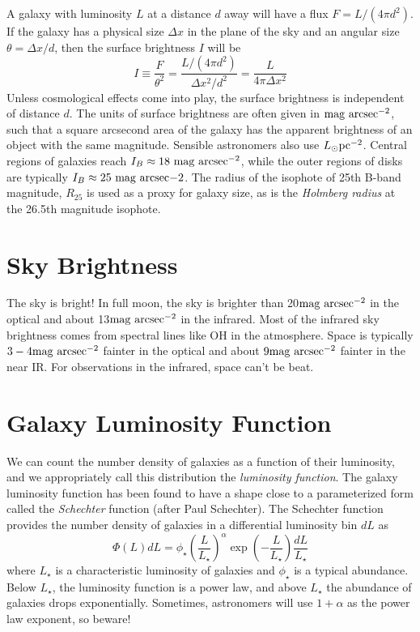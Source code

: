 \documentclass[]{article}
\begin{document}
A galaxy with luminosity $L$ at a distance $d$ away will have
a flux $F = L/(4\pi d^2)$. If the galaxy has a physical
size $\Delta x$ in the plane of the sky and an angular
size $\theta = \Delta x/d$, then the surface brightness
$I$ will be
\begin{equation}
I \equiv \frac{F}{\theta^{2}} = \frac{L/(4\pi d^2)}{\Delta x^2 / d^2} = \frac{L}{4\pi\Delta x^2}
\end{equation}
\noindent
Unless cosmological effects come into play, the surface brightness
is independent of distance $d$. The units of surface brightness are
often given in $\mathrm{mag}~\mathrm{arcsec}^{-2}$, such that a square arcsecond area
of the galaxy has the apparent brightness of an object with the
same magnitude. Sensible astronomers also use $L_{\odot}\mathrm{pc}^{-2}$. Central
regions of galaxies reach $I_{B}\approx 18~\mathrm{mag}~\mathrm{arcsec}^{-2}$, while
the outer regions of disks are typically $I_{B}\approx25~\mathrm{mag}~\mathrm{arcsec}{-2}$.
The radius of the isophote of 25th B-band magnitude, $R_{25}$ is used as
a proxy for galaxy size, as is the {\it Holmberg radius} at the 26.5th
magnitude isophote.

\section{Sky Brightness}

The sky is bright!  In full moon, the sky is brighter than 20$\mathrm{mag}~\mathrm{arcsec}^{-2}$
in the optical and about 13$\mathrm{mag}~\mathrm{arcsec}^{-2}$ in the infrared.  Most of the
infrared sky brightness comes from spectral lines like OH in the atmosphere.
Space is typically $3-4\mathrm{mag}~\mathrm{arcsec}^{-2}$ fainter in the optical and about
$9\mathrm{mag}~\mathrm{arcsec}^{-2}$ fainter in the near IR.  For observations in the infrared,
space can't be beat.

\section{Galaxy Luminosity Function}

We can count the number density of galaxies as a function of their luminosity,
and we appropriately call this distribution the {\it luminosity function}. The
galaxy luminosity function has been found to have a shape close to a parameterized
form called the {\it Schechter} function (after Paul Schechter).  The Schechter
function provides the number density of galaxies in a differential luminosity bin
$dL$ as
\begin{equation}
\label{eqn:schechter_function_luminosity}
\Phi(L)dL = \phi_{\star} \left(\frac{L}{L_{\star}}\right)^{\alpha}\exp\left(-\frac{L}{L_{\star}}\right)\frac{dL}{L_{\star}}
\end{equation}
\noindent
where $L_{\star}$ is a characteristic luminosity of galaxies and $\phi_{\star}$ is 
a typical abundance.  Below $L_\star$, the luminosity function is a power law, and
above $L_\star$ the abundance of galaxies drops exponentially. Sometimes, astronomers
will use $1+\alpha$ as the power law exponent, so beware!
\end{document}
